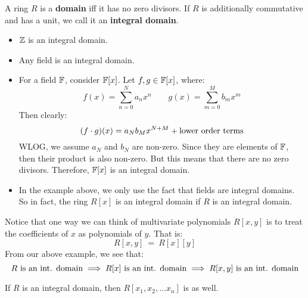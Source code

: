\begin{defn}
    A ring $ R $ is a \textbf{domain} iff it has no zero divisors. \vsp
    If $ R $ is additionally commutative and has a unit, we call it an \textbf{integral domain}.
\end{defn}

\begin{xmp}[source=Primary Source Material]
    \begin{itemize}
        \item $ \mathbb{Z} $ is an integral domain.
        \item Any field is an integral domain.
        \item For a field $ \mathbb{F} $, consider $ \mathbb{F}[x] $.
            Let $ f, g \in \mathbb{F}[x] $, where:
            \begin{equation*}
                f(x) = \sum_{n=0}^{N}a_{n}x^{n} \qquad
                g(x) = \sum_{m=0}^{M}b_{m}x^{m}
            \end{equation*}
            Then clearly:
            \begin{equation*}
                (f\cdot g)(x) = a_{N}b_{M}x^{N+M} + \textrm{lower order terms}
            \end{equation*}
            WLOG, we assume $ a_{N} $ and $ b_{N} $ are non-zero.
            Since they are elements of $ \mathbb{F} $, then their product is also non-zero.
            But this means that there are no zero divisors.
            Therefore, $ \mathbb{F}[x] $ is an integral domain.
        \item In the example above, we only use the fact that fields are integral domains.
            So in fact, the ring $ R[x] $ is an integral domain if $ R $ is an integral domain.
    \end{itemize}
\end{xmp}

Notice that one way we can think of multivariate polynomials $ R[x, y] $ is to treat the
coefficients of $ x $ as polynomials of $ y $. That is:
\begin{equation*}
    R[x, y] \ = \ R[x][y]
\end{equation*}
From our above example, we see that:
\begin{equation*}
    R \textrm{ is an int. domain} \implies R[x] \textrm{ is an int. domain}
    \implies R[x, y] \textrm{ is an int. domain}
\end{equation*}

\begin{crll}
    If $ R $ is an integral domain, then $ R[x_{1}, x_{2}, \dots x_{n}] $ is as well.
\end{crll}

